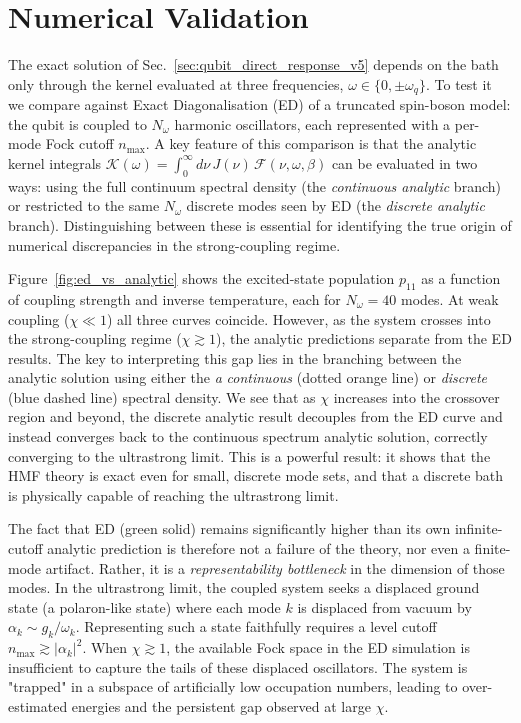 ﻿%
\section{Numerical Validation}
\label{sec:numerical_results}

The exact solution of Sec.~\ref{sec:qubit_direct_response_v5} depends on the
bath only through the kernel evaluated at three frequencies,
$\omega \in \{0, \pm\omega_q\}$.
To test it we compare against Exact Diagonalisation (ED) of a truncated
spin-boson model: the qubit is coupled to $N_\omega$ harmonic oscillators,
each represented with a per-mode Fock cutoff $n_{\max}$.
A key feature of this comparison is that the analytic kernel integrals
$\mathcal{K}(\omega) = \int_0^\infty d\nu\, J(\nu)\, \mathcal{F}(\nu,\omega,\beta)$
can be evaluated in two ways: using the full continuum spectral density
(the \emph{continuous analytic} branch) or restricted to the same $N_\omega$
discrete modes seen by ED (the \emph{discrete analytic} branch).
Distinguishing between these is essential for identifying the true origin 
of numerical discrepancies in the strong-coupling regime.

Figure~\ref{fig:ed_vs_analytic} shows the excited-state population $p_{11}$
as a function of coupling strength and inverse temperature, each for $N_\omega = 40$ modes. At weak coupling ($\chi \ll 1$) all three curves coincide.
However, as the system crosses into the strong-coupling regime ($\chi \gtrsim 1$),
the analytic predictions separate from the ED results. The key to interpreting this gap lies in the branching between the analytic solution using either the \emph a \emph{continuous} (dotted orange line) or \emph{discrete} (blue dashed line) spectral density. We see that as $\chi$ increases into the crossover region and beyond,
the discrete analytic result decouples from the ED curve and instead converges back to the continuous spectrum analytic solution, correctly converging to the
ultrastrong limit. This is a powerful result: it shows that the HMF
theory is exact even for small, discrete mode sets, and that a discrete 
bath is physically capable of reaching the ultrastrong limit.

The fact that ED (green solid) remains significantly higher than its own
infinite-cutoff analytic prediction is therefore not a failure of the theory,
nor even a finite-mode artifact. Rather, it is a \emph{representability bottleneck} in the dimension of those modes. In the ultrastrong limit, the coupled system seeks a displaced ground state (a polaron-like state) where each mode $k$ is displaced from vacuum by $\alpha_k \sim g_k/\omega_k$. Representing such a state faithfully requires
a level cutoff $n_{\max} \gtrsim |\alpha_k|^2$. When $\chi \gtrsim 1$, the
available Fock space in the ED simulation is insufficient to capture the
tails of these displaced oscillators. The system is "trapped" in a subspace
of artificially low occupation numbers, leading to over-estimated energies
and the persistent gap observed at large $\chi$.


